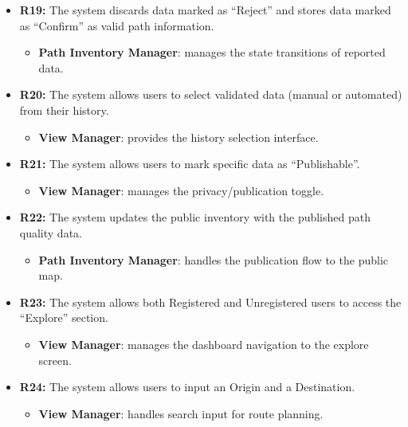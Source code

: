 \begin{itemize}
          \begin{itemize}
              \item \textbf{View Manager}: captures user validation inputs.
          \end{itemize}
    \item \textbf{R19:} The system discards data marked as “Reject” and stores data marked as “Confirm” as valid path information.
          \begin{itemize}
              \item \textbf{Path Inventory Manager}: manages the state transitions of reported data.
          \end{itemize}
    \item \textbf{R20:} The system allows users to select validated data (manual or automated) from their history.
          \begin{itemize}
              \item \textbf{View Manager}: provides the history selection interface.
          \end{itemize}
    \item \textbf{R21:} The system allows users to mark specific data as “Publishable”.
          \begin{itemize}
              \item \textbf{View Manager}: manages the privacy/publication toggle.
          \end{itemize}
    \item \textbf{R22:} The system updates the public inventory with the published path quality data.
          \begin{itemize}
              \item \textbf{Path Inventory Manager}: handles the publication flow to the public map.
          \end{itemize}
    \item \textbf{R23:} The system allows both Registered and Unregistered users to access the “Explore” section.
          \begin{itemize}
              \item \textbf{View Manager}: manages the dashboard navigation to the explore screen.
          \end{itemize}
    \item \textbf{R24:} The system allows users to input an Origin and a Destination.
          \begin{itemize}
              \item \textbf{View Manager}: handles search input for route planning.

\end{itemize}
\end{itemize}

